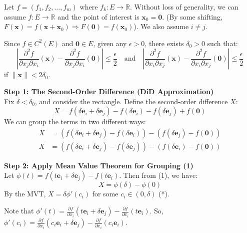 \begin{pfbox}

Let $f = (f_1, f_2, \dots, f_m)$ where $f_k: E \to \mathbb{R}$. Without loss of generality, we can assume $f: E \to \mathbb{R}$ and the point of interest is $\mathbf{x}_0 = \mathbf{0}$. (By some shifting, $F(\mathbf{x}) = f(\mathbf{x} + \mathbf{x}_0) \Rightarrow F(\mathbf{0}) = f(\mathbf{x}_0)$). We also assume $i \neq j$.

Since $f \in C^2(E)$ and $\mathbf{0} \in E$, given any $\epsilon > 0$, there exists $\delta_0 > 0$ such that:
$$ \left| \frac{\partial^2 f}{\partial x_j \partial x_i}(\mathbf{x}) - \frac{\partial^2 f}{\partial x_j \partial x_i}(\mathbf{0}) \right| \le \frac{\epsilon}{2} \quad \text{and} \quad \left| \frac{\partial^2 f}{\partial x_i \partial x_j}(\mathbf{x}) - \frac{\partial^2 f}{\partial x_i \partial x_j}(\mathbf{0}) \right| \le \frac{\epsilon}{2} $$
if $\|\mathbf{x}\| < 2\delta_0$.

\vspace{0.8em}
\noindent \textbf{Step 1: The Second-Order Difference (DiD Approximation)}\\
Fix $\delta < \delta_0$, and consider the rectangle. Define the second-order difference $X$:
$$ X = f(\delta \mathbf{e}_i + \delta \mathbf{e}_j) - f(\delta \mathbf{e}_i) - f(\delta \mathbf{e}_j) + f(\mathbf{0}) $$
We can group the terms in two different ways:
\begin{align}
X &= \left( f(\delta \mathbf{e}_i + \delta \mathbf{e}_j) - f(\delta \mathbf{e}_i) \right) - \left( f(\delta \mathbf{e}_j) - f(\mathbf{0}) \right) \tag{1} \\
X &= \left( f(\delta \mathbf{e}_i + \delta \mathbf{e}_j) - f(\delta \mathbf{e}_j) \right) - \left( f(\delta \mathbf{e}_i) - f(\mathbf{0}) \right) \tag{2}
\end{align}

\vspace{0.8em}
\noindent \textbf{Step 2: Apply Mean Value Theorem for Grouping (1)}\\
Let $\phi(t) = f(t \mathbf{e}_i + \delta \mathbf{e}_j) - f(t \mathbf{e}_i)$. Then from (1), we have:
$$ X = \phi(\delta) - \phi(0) $$
By the MVT, $X = \delta \phi'(c_i)$ for some $c_i \in (0, \delta)$ \quad (*).

Note that $\phi'(t) = \frac{\partial f}{\partial x_i}(t \mathbf{e}_i + \delta \mathbf{e}_j) - \frac{\partial f}{\partial x_i}(t \mathbf{e}_i)$.
So, $\phi'(c_i) = \frac{\partial f}{\partial x_i}(c_i \mathbf{e}_i + \delta \mathbf{e}_j) - \frac{\partial f}{\partial x_i}(c_i \mathbf{e}_i)$.


\end{pfbox}

